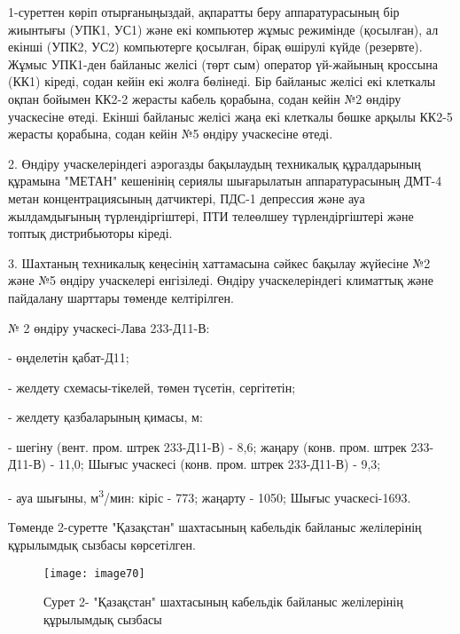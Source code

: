 \begin{multicols}{2}


1-суреттен көріп отырғаныңыздай, ақпаратты беру аппаратурасының бір
жиынтығы (УПК1, УС1) және екі компьютер жұмыс режимінде (қосылған), ал
екінші (УПК2, УС2) компьютерге қосылған, бірақ өшірулі күйде (резервте).
Жұмыс УПК1-ден байланыс желісі (төрт сым) оператор үй-жайының кроссына
(КК1) кіреді, содан кейін екі жолға бөлінеді. Бір байланыс желісі екі
клеткалы оқпан бойымен КК2-2 жерасты кабель қорабына, содан кейін №2
өндіру учаскесіне өтеді. Екінші байланыс желісі жаңа екі клеткалы бөшке
арқылы КК2-5 жерасты қорабына, содан кейін №5 өндіру учаскесіне өтеді.

2. Өндіру учаскелеріндегі аэрогазды бақылаудың техникалық құралдарының
құрамына "МЕТАН" кешенінің сериялы шығарылатын аппаратурасының ДМТ-4
метан концентрациясының датчиктері, ПДС-1 депрессия және ауа
жылдамдығының түрлендіргіштері, ПТИ телеөлшеу түрлендіргіштері және
топтық дистрибьюторы кіреді.

3. Шахтаның техникалық кеңесінің хаттамасына сәйкес бақылау жүйесіне №2
және №5 өндіру учаскелері енгізіледі. Өндіру учаскелеріндегі климаттық
және пайдалану шарттары төменде келтірілген.

№ 2 өндіру учаскесі-Лава 233-Д11-В:

- өңделетін қабат-Д11;

- желдету схемасы-тікелей, төмен түсетін, сергітетін;

- желдету қазбаларының қимасы, м:

- шегіну (вент. пром. штрек 233-Д11-В) - 8,6; жаңару (конв. пром. штрек
233-Д11-В) - 11,0; Шығыс учаскесі (конв. пром. штрек 233-Д11-В) - 9,3;

- ауа шығыны, м\textsuperscript{3}/мин: кіріс - 773; жаңарту - 1050;
Шығыс учаскесі-1693.

Төменде 2-суретте "Қазақстан" шахтасының кабельдік байланыс желілерінің
құрылымдық сызбасы көрсетілген.
\end{multicols}

\begin{figure}[H]
    \centering
    \texttt{[image: image70]}
    \caption*{Сурет 2- "Қазақстан" шахтасының кабельдік байланыс желілерінің құрылымдық сызбасы}
\end{figure}

